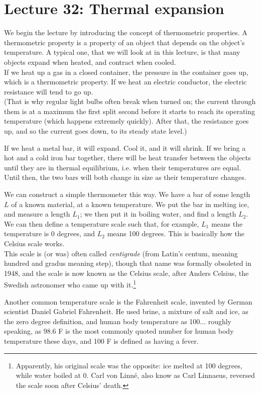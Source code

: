 \section{Lecture 32: Thermal expansion}

We begin the lecture by introducing the concept of thermometric properties. A thermometric property is a property of an object that depends on the object's temperature. A typical one, that we will look at in this lecture, is that many objects expand when heated, and contract when cooled.\\
If we heat up a gas in a closed container, the pressure in the container goes up, which is a thermometric property. If we heat an electric conductor, the electric resistance will tend to go up.\\
(That is why regular light bulbs often break when turned on; the current through them is at a maximum the first split second before it starts to reach its operating temperature (which happens extremely quickly). After that, the resistance goes up, and so the current goes down, to its steady state level.)

If we heat a metal bar, it will expand. Cool it, and it will shrink. If we bring a hot and a cold iron bar together, there will be heat transfer between the objects until they are in thermal equilibrium, i.e. when their temperatures are equal. Until then, the two bars will both change in size as their temperature changes.

We can construct a simple thermometer this way. We have a bar of some length $L$ of a known material, at a known temperature. We put the bar in melting ice, and measure a length $L_1$; we then put it in boiling water, and find a length $L_2$. We can then define a temperature scale such that, for example, $L_1$ means the temperature is 0 degrees, and $L_2$ means 100 degrees. This is basically how the Celsius scale works.\\
This scale is (or was) often called \emph{centigrade} (from Latin's centum, meaning hundred and gradus meaning step), though that name was formally obsoleted in 1948, and the scale is now known as the Celsius scale, after Anders Celsius, the Swedish astronomer who came up with it.\footnote{Apparently, his original scale was the opposite: ice melted at 100 degrees, while water boiled at 0. Carl von Linn\'e, also know as Carl Linnaeus, reversed the scale soon after Celsius' death.}

Another common temperature scale is the Fahrenheit scale, invented by German scientist Daniel Gabriel Fahrenheit. He used brine, a mixture of salt and ice, as the zero degree definition, and human body temperature as 100... roughly speaking, as 98.6 F is the most commonly quoted number for human body temperature these days, and 100 F is defined as having a fever.

